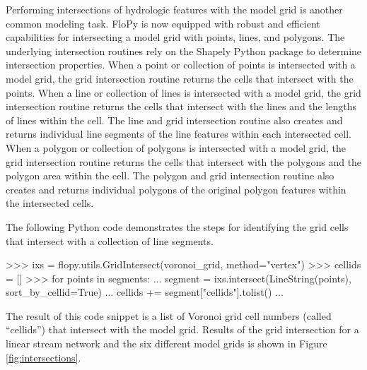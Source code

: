 \documentclass[11pt, oneside]{article}   	%
\begin{document}
Performing intersections of hydrologic features with the model grid is another common modeling task.  FloPy is now equipped with robust and efficient capabilities for intersecting a model grid with points, lines, and polygons.  The underlying intersection routines rely on the Shapely Python package \citep{shapely-gillies} to determine intersection properties.  When a point or collection of points is intersected with a model grid, the grid intersection routine returns the cells that intersect with the points.  When a line or collection of lines is intersected with a model grid, the grid intersection routine returns the cells that intersect with the lines and the lengths of lines within the cell.  The line and grid intersection routine also creates and returns individual line segments of the line features within each intersected cell.  When a polygon or collection of polygons is intersected with a model grid, the grid intersection routine returns the cells that intersect with the polygons and the polygon area within the cell.  The polygon and grid intersection routine also creates and returns individual polygons of the original polygon features within the intersected cells.

The following Python code demonstrates the steps for identifying the grid cells that intersect with a collection of line segments.

\begin{python}
>>> ixs = flopy.utils.GridIntersect(voronoi_grid, method="vertex")
>>> cellids = []
>>> for points in segments:
...     segment = ixs.intersect(LineString(points), sort_by_cellid=True)
...     cellids += segment["cellids"].tolist()
...
\end{python}

\noindent The result of this code snippet is a list of Voronoi grid cell numbers (called ``cellids'') that intersect with the model grid.   Results of the grid intersection for a linear stream network and the six different model grids is shown in Figure \ref{fig:intersections}.
\end{document}
